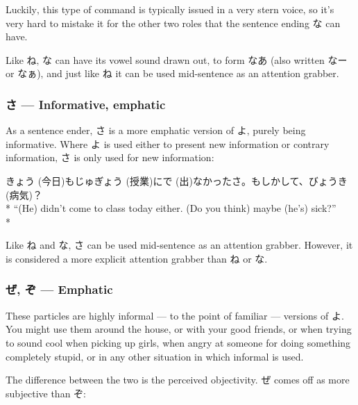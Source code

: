 \documentclass[11pt, b5paper, twoside, openright, onecolumn]{book}
\makeatletter
\newcommand*{\rubystack}[2]{{\relscale{0.5}%
  \begin{tabular}[b]{@{}c@{}}%
    {#1}\\%
   {\textscale{2}{#2}}%
  \end{tabular}}%
}
\DeclareRobustCommand*{\ruby}[2]{%
  \mbox{%
    \setlength{\parskip}{0ex}%
    \BeginAccSupp{method=pdfstringdef,ActualText={#1}}%
      \rubystack{\phantom{#2}}{#1}%
      \llap{%
        \rubystack{#2}{\phantom{#1}}%
      }%
    \EndAccSupp{}%
  }%
}
\renewcommand*{\ruby}[2]{#2 (#1)}%
\newenvironment{exampleblock}{
\setlength{\parindent}{0.6in}
\begin{minipage}[t]{\dimexpr\textwidth-\parindent}}
{\end{minipage}}
\makeatother
\begin{document}
Luckily‚ this type of command is typically issued in a very stern voice‚ so it’s very hard to mistake it for the other two roles that the sentence ending な can have.

Like ね‚ な can have its vowel sound drawn out‚ to form なあ (also written なー or なぁ)‚ and just like ね it can be used mid-sentence as an attention grabber.

\subsubsection{さ — Informative‚ emphatic}

As a sentence ender‚ さ is a more emphatic version of よ‚ purely being informative. Where よ is used either to present new information or contrary information‚ さ is only used for new information:

\vspace{0.4cm}
\begin{exampleblock}
\ruby{今日}{きょう}も\ruby{授業}{じゅぎょう}に\ruby{出}{で}なかったさ。もしかして、\ruby{病気}{びょうき}？ \\* 
“(He) didn’t come to class today either. (Do you think) maybe (he’s) sick?” \\* 
\end{exampleblock}
\vspace{0.2cm}

Like ね and な‚ さ can be used mid-sentence as an attention grabber. However‚ it is considered a more explicit attention grabber than ね or な.

\subsubsection{ぜ‚ ぞ — Emphatic}

These particles are highly informal — to the point of familiar — versions of よ. You might use them around the house‚ or with your good friends‚ or when trying to sound cool when picking up girls‚ when angry at someone for doing something completely stupid‚ or in any other situation in which informal  is used.

The difference between the two is the perceived objectivity. ぜ comes off as more subjective than ぞ:
\end{document}
